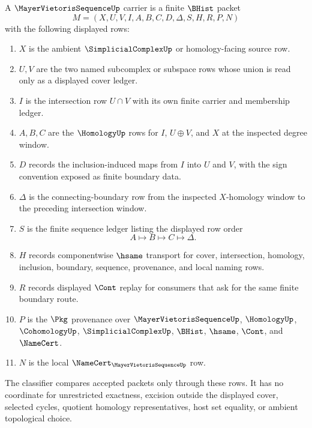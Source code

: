 \begin{definition}
\label{def:mayer-vietoris-sequence-carrier}
A $\MayerVietorisSequenceUp$ carrier is a finite $\BHist$ packet
$$
M=(X,U,V,I,A,B,C,D,\Delta,S,H,R,P,N)
$$
with the following displayed rows:
\begin{enumerate}
\item $X$ is the ambient $\SimplicialComplexUp$ or homology-facing source row.
\item $U,V$ are the two named subcomplex or subspace rows whose union is read only as a displayed cover ledger.
\item $I$ is the intersection row $U\cap V$ with its own finite carrier and membership ledger.
\item $A,B,C$ are the $\HomologyUp$ rows for $I$, $U\oplus V$, and $X$ at the inspected degree window.
\item $D$ records the inclusion-induced maps from $I$ into $U$ and $V$, with the sign convention exposed as finite boundary data.
\item $\Delta$ is the connecting-boundary row from the inspected $X$-homology window to the preceding intersection window.
\item $S$ is the finite sequence ledger listing the displayed row order
$$
A \longmapsto B \longmapsto C \longmapsto \Delta .
$$
\item $H$ records componentwise $\hsame$ transport for cover, intersection, homology, inclusion, boundary, sequence, provenance, and local naming rows.
\item $R$ records displayed $\Cont$ replay for consumers that ask for the same finite boundary route.
\item $P$ is the $\Pkg$ provenance over $\MayerVietorisSequenceUp$, $\HomologyUp$, $\CohomologyUp$, $\SimplicialComplexUp$, $\BHist$, $\hsame$, $\Cont$, and $\NameCert$.
\item $N$ is the local $\NameCert_{\MayerVietorisSequenceUp}$ row.
\end{enumerate}
The classifier compares accepted packets only through these rows. It has no coordinate for unrestricted exactness, excision outside the displayed cover, selected cycles, quotient homology representatives, host set equality, or ambient topological choice.
\end{definition}


